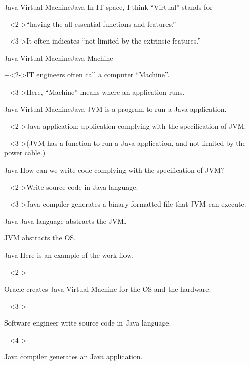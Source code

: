 \begin{frame}{Java Virtual Machine}{Java}
    In IT space, I think ``Virtual'' stands for 
    \vspace{4ex}

    \onslide+<2->{``having the all essential functions and features.''}
    \vspace{4ex}

    \onslide+<3->{It often indicates ``not limited by the extrinsic features.''}
\end{frame}


\begin{frame}{Java Virtual Machine}{Java}
    Machine
    \vspace{4ex}

    \onslide+<2->{IT engineers often call a computer ``Machine''.}
    \vspace{4ex}

    \onslide+<3->{Here, ``Machine'' means where an application runs.}
\end{frame}


\begin{frame}{Java Virtual Machine}{Java}
    JVM is a program to run a Java application.
    \vspace{4ex}

    \onslide+<2->{Java application: application complying with the specification of JVM.}
    \vspace{4ex}

    \onslide+<3->{(JVM has a function to run a Java application, and not limited by the power cable.)}
\end{frame}


\begin{frame}{Java}{}
    How can we write code complying with the specification of JVM?
    \vspace{4ex}

    \onslide+<2->{Write source code in Java language.}
    \vspace{4ex}

    \onslide+<3->{Java compiler generates a binary formatted file that JVM can execute.}
\end{frame}


\begin{frame}{Java}{}
    Java language abstracts the JVM.
    \vspace{4ex}

    JVM abstracts the OS.
\end{frame}


\begin{frame}{Java}{}
    Here is an example of the work flow.
    \vspace{4ex}

    \begin{enumerate}
        \onslide+<2->{\item Oracle creates Java Virtual Machine for the OS and the hardware.}
        \onslide+<3->{\item Software engineer write source code in Java language.}
        \onslide+<4->{\item Java compiler generates an Java application.}
    \end{enumerate}
\end{frame}


